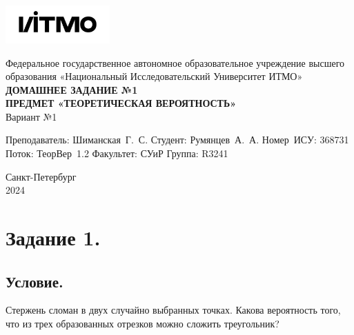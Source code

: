 \documentclass[a4paper, 12pt]{article}
\begin{document}
    \begin{titlepage}

        \begin{center}
        \includegraphics[width=0.3\textwidth]{itmo.png} %
        \vfill

        Федеральное государственное автономное образовательное учреждение высшего образования
        «Национальный Исследовательский Университет ИТМО»\\

        \vfill
        {\large\bf ДОМАШНЕЕ ЗАДАНИЕ №1}\\
        {\large\bf ПРЕДМЕТ «ТЕОРЕТИЧЕСКАЯ ВЕРОЯТНОСТЬ»}\\
        Вариант №1
        \vfill

        \begin{flushright}
            \begin{minipage}{.45\textwidth}
            {
                \hbox{Преподаватель:}
                \hbox{Шиманская Г. С.}
                \hbox{Студент:}
                \hbox{Румянцев А. А.}
                \hbox{}
                \hbox{Номер ИСУ:}
                \hbox{368731}
                \hbox{Поток:}
                \hbox{ТеорВер 1.2}
                \hbox{Факультет:}
                \hbox{СУиР}
                \hbox{Группа:}
                \hbox{R3241}
            }
            \end{minipage}
        \end{flushright}

        \vfill

        Санкт-Петербург\\
        2024
        \end{center}
    \end{titlepage}

    \tableofcontents

    \newpage
    \section{Задание 1.}
    \subsection{Условие.}
    Стержень сломан в двух случайно выбранных точках. Какова вероятность того, что из
    трех образованных отрезков можно сложить треугольник?
\end{document}
